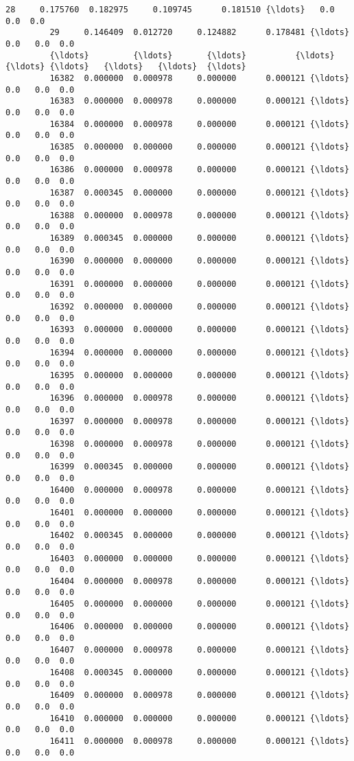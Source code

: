 \documentclass[11pt]{article}
\begin{document}
\begin{Verbatim}[commandchars=\\\{\}]
         28     0.175760  0.182975     0.109745      0.181510 {\ldots}   0.0   0.0  0.0   
         29     0.146409  0.012720     0.124882      0.178481 {\ldots}   0.0   0.0  0.0   
         {\ldots}         {\ldots}       {\ldots}          {\ldots}           {\ldots} {\ldots}   {\ldots}   {\ldots}  {\ldots}   
         16382  0.000000  0.000978     0.000000      0.000121 {\ldots}   0.0   0.0  0.0   
         16383  0.000000  0.000978     0.000000      0.000121 {\ldots}   0.0   0.0  0.0   
         16384  0.000000  0.000978     0.000000      0.000121 {\ldots}   0.0   0.0  0.0   
         16385  0.000000  0.000000     0.000000      0.000121 {\ldots}   0.0   0.0  0.0   
         16386  0.000000  0.000978     0.000000      0.000121 {\ldots}   0.0   0.0  0.0   
         16387  0.000345  0.000000     0.000000      0.000121 {\ldots}   0.0   0.0  0.0   
         16388  0.000000  0.000978     0.000000      0.000121 {\ldots}   0.0   0.0  0.0   
         16389  0.000345  0.000000     0.000000      0.000121 {\ldots}   0.0   0.0  0.0   
         16390  0.000000  0.000000     0.000000      0.000121 {\ldots}   0.0   0.0  0.0   
         16391  0.000000  0.000000     0.000000      0.000121 {\ldots}   0.0   0.0  0.0   
         16392  0.000000  0.000000     0.000000      0.000121 {\ldots}   0.0   0.0  0.0   
         16393  0.000000  0.000000     0.000000      0.000121 {\ldots}   0.0   0.0  0.0   
         16394  0.000000  0.000000     0.000000      0.000121 {\ldots}   0.0   0.0  0.0   
         16395  0.000000  0.000000     0.000000      0.000121 {\ldots}   0.0   0.0  0.0   
         16396  0.000000  0.000978     0.000000      0.000121 {\ldots}   0.0   0.0  0.0   
         16397  0.000000  0.000978     0.000000      0.000121 {\ldots}   0.0   0.0  0.0   
         16398  0.000000  0.000978     0.000000      0.000121 {\ldots}   0.0   0.0  0.0   
         16399  0.000345  0.000000     0.000000      0.000121 {\ldots}   0.0   0.0  0.0   
         16400  0.000000  0.000978     0.000000      0.000121 {\ldots}   0.0   0.0  0.0   
         16401  0.000000  0.000000     0.000000      0.000121 {\ldots}   0.0   0.0  0.0   
         16402  0.000345  0.000000     0.000000      0.000121 {\ldots}   0.0   0.0  0.0   
         16403  0.000000  0.000000     0.000000      0.000121 {\ldots}   0.0   0.0  0.0   
         16404  0.000000  0.000978     0.000000      0.000121 {\ldots}   0.0   0.0  0.0   
         16405  0.000000  0.000000     0.000000      0.000121 {\ldots}   0.0   0.0  0.0   
         16406  0.000000  0.000000     0.000000      0.000121 {\ldots}   0.0   0.0  0.0   
         16407  0.000000  0.000978     0.000000      0.000121 {\ldots}   0.0   0.0  0.0   
         16408  0.000345  0.000000     0.000000      0.000121 {\ldots}   0.0   0.0  0.0   
         16409  0.000000  0.000978     0.000000      0.000121 {\ldots}   0.0   0.0  0.0   
         16410  0.000000  0.000000     0.000000      0.000121 {\ldots}   0.0   0.0  0.0   
         16411  0.000000  0.000978     0.000000      0.000121 {\ldots}   0.0   0.0  0.0   
         

\end{Verbatim}
\end{document}

